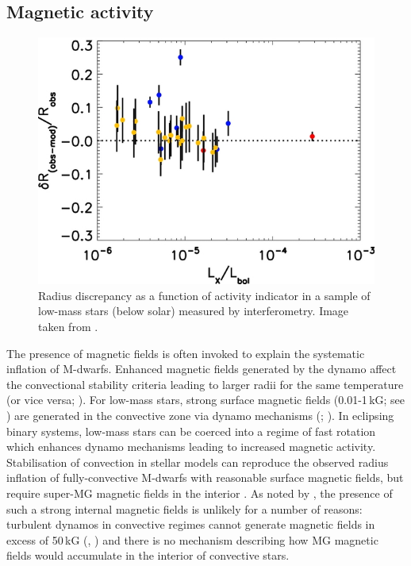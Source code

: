 \subsection{Magnetic activity}

\begin{figure}
    \centering
    \includegraphics[width=\textwidth]{3-images/spada.png}
    \caption{Radius discrepancy as a function of activity indicator in a sample of low-mass stars (below solar) measured by interferometry. Image taken from \protect\citet{2013ApJ...776...87S}.}
    \label{fig:inflation_VS_Lx}
\end{figure}

The presence of magnetic fields is often invoked to explain the systematic inflation of M-dwarfs. Enhanced magnetic fields generated by the dynamo affect the convectional stability criteria leading to larger radii for the same temperature (or vice versa; \citealt{2013ApJ...776...87S}). For low-mass stars, strong surface magnetic fields (0.01-1\,kG; see \citealt{2012LRSP....9....1R}) are generated in the convective zone via dynamo mechanisms (\citealt{2013SAAS...39..187C}; \citealt{2001ApJ...559..353M}). In eclipsing binary systems, low-mass stars can be coerced into a regime of fast rotation which enhances dynamo mechanisms leading to increased magnetic activity. Stabilisation of convection in stellar models can reproduce the observed radius inflation of fully-convective M-dwarfs with reasonable surface magnetic fields, but require super-MG magnetic fields in the interior \citep{2014ApJ...789...53F}. As noted by \citet{2014ApJ...789...53F}, the presence of such a strong internal magnetic fields is unlikely for a number of reasons: turbulent dynamos in convective regimes cannot generate magnetic fields in excess of 50\,kG (\citealt{2006ApJ...638..336D}, \citealt{2008ApJ...676.1262B}) and there is no mechanism describing how MG magnetic fields would accumulate in the interior of convective stars. 
        
